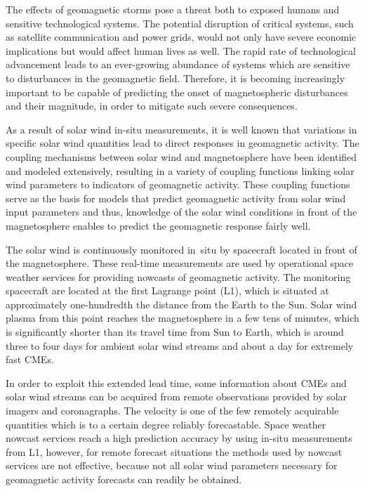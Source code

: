 The effects of geomagnetic storms pose a threat both to exposed humans and sensitive technological systems. The potential disruption of critical systems, such as satellite communication and power grids, would not only have severe economic implications but would affect human lives as well. The rapid rate of technological advancement leads to an ever-growing abundance of systems which are sensitive to disturbances in the geomagnetic field. Therefore, it is becoming increasingly important to be capable of predicting the onset of magnetospheric disturbances and their magnitude, in order to mitigate such severe consequences.

As a result of solar wind in-situ measurements, it is well known that variations in specific solar wind quantities lead to direct responses in geomagnetic activity. The coupling mechanisms between solar wind and magnetosphere have been identified and modeled extensively, resulting in a variety of coupling functions linking solar wind parameters to indicators of geomagnetic activity. These coupling functions serve as the basis for models that predict geomagnetic activity from solar wind input parameters and thus, knowledge of the solar wind conditions in front of the magnetosphere enables to predict the geomagnetic response fairly well.

The solar wind is continuously monitored in~situ by spacecraft located in front of the magnetosphere. These real-time measurements are used by operational space weather services for providing nowcasts of geomagnetic activity. The monitoring spacecraft are located at the first Lagrange point (L1), which is situated at approximately one-hundredth the distance from the Earth to the Sun.
Solar wind plasma from this point reaches the magnetosphere in a few tens of minutes, which is significantly shorter than its  travel time from Sun to Earth, which is around three to four days for ambient solar wind streams and about a day for extremely fast CMEs.

In order to exploit this extended lead time, some information about CMEs and solar wind streams can be acquired from remote observations provided by solar imagers and coronagraphs. The velocity is one of the few remotely acquirable quantities which is to a certain degree reliably forecastable.
Space weather nowcast services reach a high prediction accuracy by using in-situ measurements from L1, however, for remote forecast situations the methods used by nowcast services are not effective, because not all solar wind parameters necessary for geomagnetic activity forecasts can readily be obtained.

